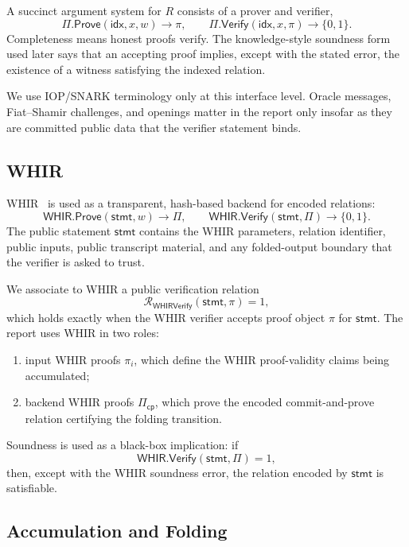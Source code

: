 \documentclass[11pt]{article}
\theoremstyle{definition}
\newcommand{\WHIR}{\mathsf{WHIR}}
\newcommand{\Verify}{\mathsf{Verify}}
\newcommand{\Prove}{\mathsf{Prove}}
\newcommand{\Rwhir}{\mathcal{R}_{\mathsf{WHIRVerify}}}
\begin{document}
A succinct argument system for \(R\) consists of a prover and verifier,
\[
  \Pi.\Prove(\mathsf{idx},x,w)\to \pi,
  \qquad
  \Pi.\Verify(\mathsf{idx},x,\pi)\to \{0,1\}.
\]
Completeness means honest proofs verify. The knowledge-style soundness form
used later says that an accepting proof implies, except with the stated error,
the existence of a witness satisfying the indexed relation.

We use IOP/SNARK terminology only at this interface level. Oracle messages,
Fiat--Shamir challenges, and openings matter in the report only insofar as they
are committed public data that the verifier statement binds.

\subsection{WHIR}
\label{sec:prelim-whir}

WHIR~\cite{WHIR} is used as a transparent, hash-based backend for encoded
relations:
\[
  \WHIR.\Prove(\mathsf{stmt},w)\to \Pi,
  \qquad
  \WHIR.\Verify(\mathsf{stmt},\Pi)\to \{0,1\}.
\]
The public statement \(\mathsf{stmt}\) contains the WHIR parameters, relation
identifier, public inputs, public transcript material, and any folded-output
boundary that the verifier is asked to trust.

We associate to WHIR a public verification relation
\[
  \Rwhir(\mathsf{stmt},\pi)=1,
\]
which holds exactly when the WHIR verifier accepts proof object \(\pi\) for
\(\mathsf{stmt}\). The report uses WHIR in two roles:
\begin{enumerate}
  \item input WHIR proofs \(\pi_i\), which define the WHIR proof-validity claims
        being accumulated;
  \item backend WHIR proofs \(\Pi_{\mathsf{cp}}\), which prove the encoded
        commit-and-prove relation certifying the folding transition.
\end{enumerate}
Soundness is used as a black-box implication: if
\[
  \WHIR.\Verify(\mathsf{stmt},\Pi)=1,
\]
then, except with the WHIR soundness error, the relation encoded by
\(\mathsf{stmt}\) is satisfiable.

\subsection{Accumulation and Folding}
\label{sec:prelim-accumulation-folding}
\end{document}
